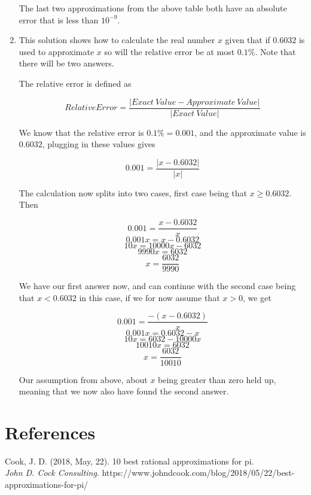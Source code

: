 \documentclass[10pt]{article}
\begin{document}
\begin{enumerate}
   The last two approximations from the above table both have an absolute error that is less than \( 10^{-9} \).

   \item This solution shows how to calculate the real number \( x \) given that if \( 0.6032 \) is used to approximate \( x \) so will the relative error be at most \( 0.1\% \). Note that there will be two answers.
   
   The relative error is defined as
   
   \[ Relative Error = \dfrac{\left| Exact \: Value - Approximate \: Value \right|}{\left| Exact \: Value\right|}\]
   
    We know that the relative error is \( 0.1\% = 0.001 \), and the approximate value is \( 0.6032 \), plugging in these values gives  
   
    \[ 0.001 = \dfrac{ \left| x - 0.6032 \right| }{ \left| x \right| } \]

    The calculation now splits into two cases, first case being that \( x \geq 0.6032 \). Then

    \[ 0.001 = \dfrac{ x - 0.6032 }{ x } \]
    \[ 0.001x =  x - 0.6032 \]
    \[ 10x =  10000x - 6032 \]
    \[ 9990x = 6032 \]
    \[ x = \dfrac{6032}{9990} \]

    We have our first answer now, and can continue with the second case being that \( x < 0.6032 \) in this case, if we for now assume that \( x > 0 \), we get

    \[ 0.001 = \dfrac{ -(x - 0.6032) }{ x } \]
    \[ 0.001x = 0.6032 - x \]
    \[ 10x =  6032 - 10000x \]
    \[ 10010x = 6032 \]
    \[ x = \dfrac{6032}{10010} \]

    Our assumption from above, about \( x \) being greater than zero held up, meaning that we now also have found the second answer.

\end{enumerate}

\section{References}

Cook, J. D. (2018, May, 22). 10 best rational approximations for pi.\\
\textit{John D. Cock Consulting}. https://www.johndcook.com/blog/2018/05/22/best-approximations-for-pi/
\end{document}
